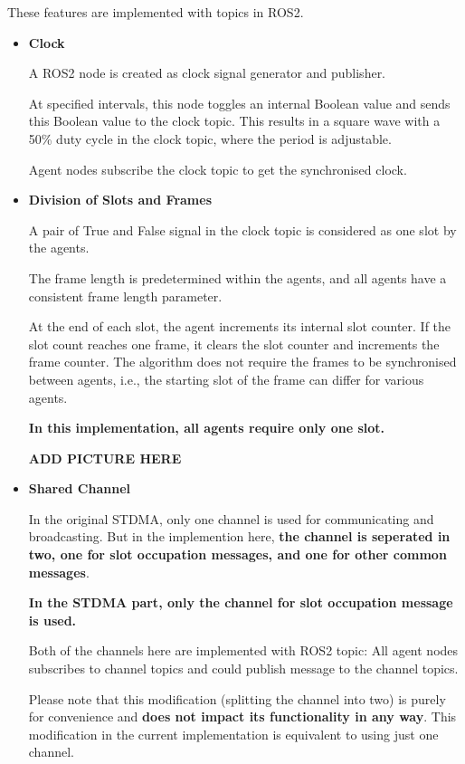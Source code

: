 These features are implemented with topics in ROS2\footnotemark. 
\begin{itemize}
    \item \textbf{Clock}
    
    A ROS2 node is created as clock signal generator and publisher.

    At specified intervals, this node toggles an internal Boolean value and sends this Boolean value to the clock topic. This results in a square wave with a 50\% duty cycle in the clock topic, where the period is adjustable.

    Agent nodes subscribe the clock topic to get the synchronised clock.

    \item \textbf{Division of Slots and Frames}
    
    A pair of True and False signal in the clock topic is considered as one slot by the agents.

    The frame length is predetermined within the agents, and all agents have a consistent frame length parameter.
    
    At the end of each slot, the agent increments its internal slot counter. If the slot count reaches one frame, it clears the slot counter and increments the frame counter. The algorithm does not require the frames to be synchronised between agents, i.e., the starting slot of the frame can differ for various agents.
    
    \textbf{In this implementation, all agents require only one slot.}

    \textbf{ADD PICTURE HERE}

    \item \textbf{Shared Channel}
    
    In the original STDMA\cite{STDMA}, only one channel is used for communicating and broadcasting. 
    But in the implemention here, \textbf{the channel is seperated in two, one for slot occupation messages, and one for other common messages}.
    
    \textbf{In the STDMA part, only the channel for slot occupation message is used.}

    Both of the channels here are implemented with ROS2 topic: All agent nodes subscribes to channel topics and could publish message to the channel topics.    

    Please note that this modification (splitting the channel into two) is purely for convenience and \textbf{does not impact its functionality in any way}.
    This modification in the current implementation is equivalent to using just one channel.    

\end{itemize}


